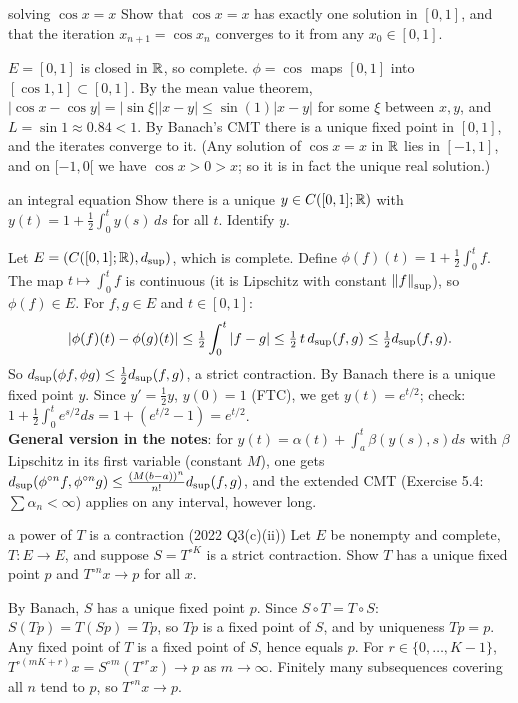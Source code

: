 \begin{exam}{solving $\cos x=x$}
Show that $\cos x=x$ has exactly one solution in $[0,1]$, and that the iteration
$x_{n+1}=\cos x_n$ converges to it from any $x_0\in[0,1]$.
\end{exam}
\begin{answer}
$E=[0,1]$ is closed in $\mathbb R$, so complete. $\phi=\cos$ maps $[0,1]$ into $[\cos1,1]\subset[0,1]$.
By the mean value theorem, $|\cos x-\cos y|=|\sin\xi||x-y|\le\sin(1)|x-y|$ for some $\xi$ between
$x,y$, and $L=\sin1\approx0.84<1$. By Banach's CMT there is a unique fixed point in $[0,1]$, and
the iterates converge to it. (Any solution of $\cos x=x$ in $\mathbb R$ lies in $[-1,1]$, and on
$[-1,0[$ we have $\cos x>0>x$; so it is in fact the unique real solution.)
\end{answer}

\begin{exam}{an integral equation}
Show there is a unique $y\in C([0,1];\mathbb R)$ with $y(t)=1+\frac12\int_0^t y(s)\,ds$ for all $t$.
Identify $y$.
\end{exam}
\begin{answer}
Let $E=(C([0,1];\mathbb R),d_{\sup})$, which is complete. Define $\phi(f)(t)=1+\frac12\int_0^tf$. The map
$t\mapsto\int_0^tf$ is continuous (it is Lipschitz with constant $\left\lVert f\right\rVert_{\sup}$), so
$\phi(f)\in E$. For $f,g\in E$ and $t\in[0,1]$:
\[|\phi(f)(t)-\phi(g)(t)|\le\tfrac12\int_0^t|f-g|\le\tfrac12\,t\,d_{\sup}(f,g)\le\tfrac12d_{\sup}(f,g).\]
So $d_{\sup}(\phi f,\phi g)\le\frac12d_{\sup}(f,g)$, a strict contraction. By Banach there is a unique
fixed point $y$. Since $y'=\frac12y$, $y(0)=1$ (FTC), we get $y(t)=e^{t/2}$; check:
$1+\frac12\int_0^te^{s/2}ds=1+(e^{t/2}-1)=e^{t/2}$.\\
\textbf{General version in the notes}: for $y(t)=\alpha(t)+\int_a^t\beta(y(s),s)ds$ with $\beta$
Lipschitz in its first variable (constant $M$), one gets
$d_{\sup}(\phi^{\circ n}f,\phi^{\circ n}g)\le\frac{(M(b-a))^n}{n!}d_{\sup}(f,g)$, and the extended CMT
(Exercise 5.4: $\sum\alpha_n<\infty$) applies on any interval, however long.
\end{answer}

\begin{exam}{a power of $T$ is a contraction (2022 Q3(c)(ii))}
Let $E$ be nonempty and complete, $T:E\to E$, and suppose $S=T^{\circ K}$ is a strict contraction.
Show $T$ has a unique fixed point $p$ and $T^{\circ n}x\to p$ for all $x$.
\end{exam}
\begin{answer}
By Banach, $S$ has a unique fixed point $p$. Since $S\circ T=T\circ S$:
$S(Tp)=T(Sp)=Tp$, so $Tp$ is a fixed point of $S$, and by uniqueness $Tp=p$. Any fixed point of
$T$ is a fixed point of $S$, hence equals $p$. For $r\in\{0,\dots,K-1\}$,
$T^{\circ(mK+r)}x=S^{\circ m}(T^{\circ r}x)\to p$ as $m\to\infty$. Finitely many subsequences
covering all $n$ tend to $p$, so $T^{\circ n}x\to p$.
\end{answer}

